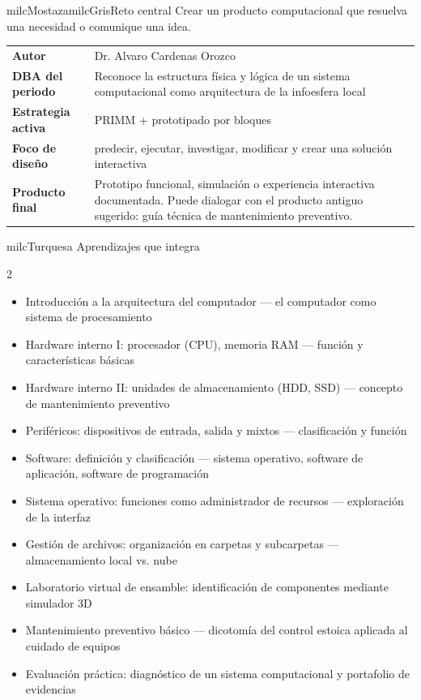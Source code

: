 \documentclass[11pt,letterpaper]{article}
\begin{document}
\begin{softbox}{milcMostaza}{milcGris}{Reto central}
Crear un producto computacional que resuelva una necesidad o comunique una idea.
\end{softbox}

\begin{tabularx}{\textwidth}{>{\bfseries}p{3.4cm}X}
\rowcolor{milcMagenta!12}Autor & Dr. Alvaro Cardenas Orozco\\
DBA del periodo & Reconoce la estructura física y lógica de un sistema computacional como arquitectura de la infoesfera local\\
Estrategia activa & PRIMM + prototipado por bloques\\
Foco de diseño & predecir, ejecutar, investigar, modificar y crear una solución interactiva\\
Producto final & Prototipo funcional, simulación o experiencia interactiva documentada. Puede dialogar con el producto antiguo sugerido: guía técnica de mantenimiento preventivo.\\
\end{tabularx}

\begin{titlebox}{milcTurquesa}
Aprendizajes que integra
\end{titlebox}
\begin{multicols}{2}
\begin{itemize}[leftmargin=*]
\item Introducción a la arquitectura del computador — el computador como sistema de procesamiento
\item Hardware interno I: procesador (CPU), memoria RAM — función y características básicas
\item Hardware interno II: unidades de almacenamiento (HDD, SSD) — concepto de mantenimiento preventivo
\item Periféricos: dispositivos de entrada, salida y mixtos — clasificación y función
\item Software: definición y clasificación — sistema operativo, software de aplicación, software de programación
\item Sistema operativo: funciones como administrador de recursos — exploración de la interfaz
\item Gestión de archivos: organización en carpetas y subcarpetas — almacenamiento local vs. nube
\item Laboratorio virtual de ensamble: identificación de componentes mediante simulador 3D
\item Mantenimiento preventivo básico — dicotomía del control estoica aplicada al cuidado de equipos
\item Evaluación práctica: diagnóstico de un sistema computacional y portafolio de evidencias
\end{itemize}
\end{multicols}
\end{document}
